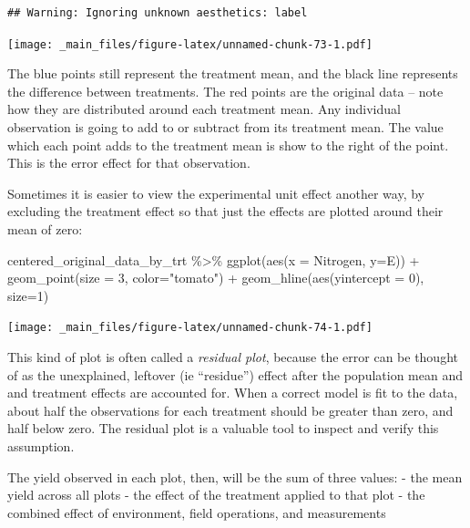 \documentclass[
]{book}
\newenvironment{Shaded}{\begin{snugshade}}{\end{snugshade}}
\newcommand{\AttributeTok}[1]{\textcolor[rgb]{0.77,0.63,0.00}{#1}}
\newcommand{\DecValTok}[1]{\textcolor[rgb]{0.00,0.00,0.81}{#1}}
\newcommand{\FunctionTok}[1]{\textcolor[rgb]{0.00,0.00,0.00}{#1}}
\newcommand{\NormalTok}[1]{#1}
\newcommand{\SpecialCharTok}[1]{\textcolor[rgb]{0.00,0.00,0.00}{#1}}
\newcommand{\StringTok}[1]{\textcolor[rgb]{0.31,0.60,0.02}{#1}}
\begin{document}
\begin{verbatim}
## Warning: Ignoring unknown aesthetics: label
\end{verbatim}

\texttt{[image: \_main\_files/figure-latex/unnamed-chunk-73-1.pdf]}

The blue points still represent the treatment mean, and the black line represents the difference between treatments. The red points are the original data -- note how they are distributed around each treatment mean. Any individual observation is going to add to or subtract from its treatment mean. The value which each point adds to the treatment mean is show to the right of the point. This is the error effect for that observation.

Sometimes it is easier to view the experimental unit effect another way, by excluding the treatment effect so that just the effects are plotted around their mean of zero:

\begin{Shaded}
\begin{Highlighting}[]
\NormalTok{centered\_original\_data\_by\_trt }\SpecialCharTok{\%\textgreater{}\%}
  \FunctionTok{ggplot}\NormalTok{(}\FunctionTok{aes}\NormalTok{(}\AttributeTok{x =}\NormalTok{ Nitrogen, }\AttributeTok{y=}\NormalTok{E)) }\SpecialCharTok{+} 
  \FunctionTok{geom\_point}\NormalTok{(}\AttributeTok{size =} \DecValTok{3}\NormalTok{, }\AttributeTok{color=}\StringTok{"tomato"}\NormalTok{) }\SpecialCharTok{+}
  \FunctionTok{geom\_hline}\NormalTok{(}\FunctionTok{aes}\NormalTok{(}\AttributeTok{yintercept =} \DecValTok{0}\NormalTok{), }\AttributeTok{size=}\DecValTok{1}\NormalTok{)}
\end{Highlighting}
\end{Shaded}

\texttt{[image: \_main\_files/figure-latex/unnamed-chunk-74-1.pdf]}

This kind of plot is often called a \emph{residual plot}, because the error can be thought of as the unexplained, leftover (ie ``residue'') effect after the population mean and and treatment effects are accounted for. When a correct model is fit to the data, about half the observations for each treatment should be greater than zero, and half below zero. The residual plot is a valuable tool to inspect and verify this assumption.

The yield observed in each plot, then, will be the sum of three values:
- the mean yield across all plots
- the effect of the treatment applied to that plot
- the combined effect of environment, field operations, and measurements
\end{document}
